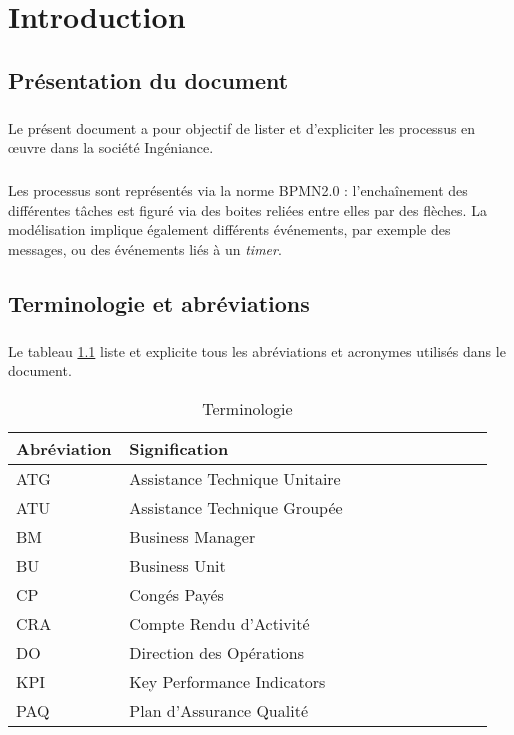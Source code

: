 \documentclass[12pt]{scrreprt}
\author{Direction des opérations}
\date{Avril 2016}
\begin{document}

\tableofcontents

\initIngeniance

\chapter{Introduction}

\section{Présentation du document}
\paragraph{} Le présent document a pour objectif de lister et d'expliciter les processus en œuvre dans la société Ingéniance.
\paragraph{} Les processus sont représentés via la norme BPMN2.0 : l’enchaînement des différentes tâches est figuré via des boites reliées entre elles par des flèches. La modélisation implique également différents événements, par exemple des messages, ou des événements liés à un \textit{timer}.


\section{Terminologie et abréviations}
\paragraph{} Le tableau \ref{abbr} liste et explicite tous les abréviations et acronymes utilisés dans le document.
\begin{table}[H]
\begin{center}
    \begin{longtable}{|p{0.2\linewidth}|p{0.75\linewidth}|}
    \hline  %
    \rowcolor[gray]{.8}
    Abréviation & Signification\\
    \hline
    ATG & Assistance Technique Unitaire\\
    \hline
    ATU & Assistance Technique Groupée\\
    \hline
    BM & Business Manager\\
    \hline
    BU & Business Unit \\
    \hline
    CP & Congés Payés\\
    \hline
    CRA & Compte Rendu d'Activité\\
    \hline
    DO & Direction des Opérations\\
    \hline
    KPI & Key Performance Indicators\\
    \hline
    PAQ & Plan d'Assurance Qualité\\
    \hline
    \end{longtable}
    \caption{Terminologie}
    \label{abbr}
\end{center}
\end{table}
\end{document}
